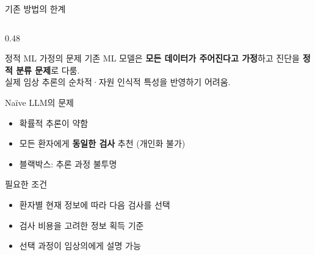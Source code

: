 \documentclass[
11pt,notheorems,hyperref={pdfauthor=whatever}
]{beamer}
\begin{document}
\begin{frame}{기존 방법의 한계}
\begin{columns}[c]
\begin{column}{0.48\textwidth}
    \begin{alertblock}{정적 ML 가정의 문제}
    \small
    기존 ML 모델은 \textbf{모든 데이터가 주어진다고 가정}하고 진단을 \textbf{정적 분류 문제}로 다룸.\\[0.4em]
    실제 임상 추론의 순차적·자원 인식적 특성을 반영하기 어려움.
    \end{alertblock}

    \vspace{0.35em}

    \begin{block}{Na\"ive LLM의 문제}
    \footnotesize
    \begin{itemize}
        \item 확률적 추론이 약함
        \item 모든 환자에게 \textbf{동일한 검사} 추천 (개인화 불가)
        \item 블랙박스: 추론 과정 불투명
    \end{itemize}
    \end{block}

    \vspace{0.35em}

    \begin{block}{필요한 조건}
    \footnotesize
    \begin{itemize}\itemsep0.25em
        \item 환자별 현재 정보에 따라 다음 검사를 선택
        \item 검사 비용을 고려한 정보 획득 기준
        \item 선택 과정이 임상의에게 설명 가능
    \end{itemize}
    \end{block}
\end{column}

\end{columns}
\end{frame}
\end{document}
